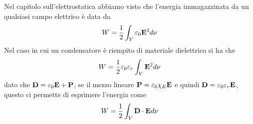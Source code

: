 Nel capitolo sull'elettrostatica abbiamo visto che l'energia immagazzinata da un qualsiasi campo elettrico \`e data da 
\begin{equation*}
	W = \frac{1}{2} \int_{V} \varepsilon_0 \bold{E}^2 d\nu
\end{equation*}
Nel caso in cui un condensatore \`e riempito di materiale dielettrico si ha che 
\begin{equation*}
	W = \frac{1}{2}\varepsilon_{0}\varepsilon_{r} \int_{V} \bold{E}^2 d\nu 
\end{equation*}
dato che $\bold{D} = \varepsilon_0 \bold{E} + \bold{P}$, se il mezzo lineare $\bold{P} = \varepsilon_0 \chi_{E} \bold{E}$ e quindi $\bold{D} = \varepsilon_{0}\varepsilon_{r}\bold{E}$, questo ci permette di esprimere l'energia come 
\begin{equation}
	W =  \frac{1}{2} \int_{V} \bold{D} \cdot \bold{E} d\nu
\end{equation}


